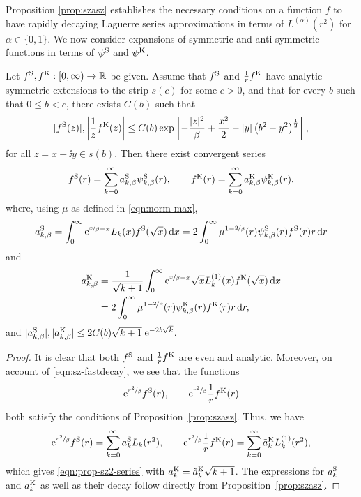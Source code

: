 Proposition \ref{prop:szasz} establishes the necessary conditions on a function $f$ to have rapidly decaying
Laguerre series approximations in terms of $L^{(\alpha)}(r^2)$ for $\alpha\in\{0,1\}$. We now consider
expansions of symmetric and anti-symmetric functions in terms of $\psi^{\mathrm{S}}$ and $\psi^{\mathrm{K}}$.

\begin{proposition} \label{prop:sz2}
Let $f^{\mathrm{S}}, f^{\mathrm{K}}: [0,\infty) \to \mathbb{R}$ be given. Assume that $f^{\mathrm{S}}$ and $\frac{1}{r}f^{\mathrm{K}}$ have analytic
symmetric extensions to the strip $s(c)$ for some $c>0$, and that for every $b$ such that $0\leq b<c$, there
exists $C(b)$ such that
\begin{equation} \label{eqn:sz-fastdecay}
    |f^{\mathrm{S}}(z)|, \left|\frac{1}{z}f^{\mathrm{K}}(z)\right| \leq C(b)
    \exp\left[-\frac{|z|^2}{\beta}+\frac{x^2}{2} - |y|\left(b^2 - y^2\right)^{\frac{1}{2}}\right],
\end{equation}
for all $z=x+\ii y \in s(b)$. Then there exist convergent series
\begin{equation} \label{eqn:prop-sz2-series}
    f^{\mathrm{S}}(r) = \sum_{k=0}^\infty a^{\mathrm{S}}_{k,\beta} \psi^{\mathrm{S}}_{k,\beta}(r), \qquad
    f^{\mathrm{K}}(r) = \sum_{k=0}^\infty a^{\mathrm{K}}_{k,\beta} \psi^{\mathrm{K}}_{k,\beta}(r),
\end{equation}
where, using $\mu$ as defined in \eqref{eqn:norm-max},
\begin{equation*}
    a^{\mathrm{S}}_{k,\beta} = \int_0^\infty \mathrm{e}^{\nicefrac{x}{\beta}-x} L_k(x) f^{\mathrm{S}}(\sqrt{x}) \,\mathrm{d} x
             = 2\int_0^\infty \mu^{1-\nicefrac{2}{\beta}}(r) \psi^{\mathrm{S}}_{k,\beta}(r) f^{\mathrm{S}}(r) r \,\mathrm{d} r \\
\end{equation*}
and
\begin{align*}
    a^{\mathrm{K}}_{k,\beta}
        &= \frac{1}{\sqrt{k+1}} \int_0^\infty \mathrm{e}^{\nicefrac{x}{\beta}-x}
                        \sqrt{x} L^{(1)}_k(x) f^{\mathrm{K}}(\sqrt{x}) \,\mathrm{d} x \\
        &= 2\int_0^\infty \mu^{1-\nicefrac{2}{\beta}}(r) \psi^{\mathrm{K}}_{k,\beta}(r) f^{\mathrm{K}}(r) r \,\mathrm{d} r,
\end{align*}
and $|a^{\mathrm{S}}_{k,\beta}|, |a^{\mathrm{K}}_{k,\beta}| \leq 2C(b)\sqrt{k+1}\;\mathrm{e}^{-2b\sqrt{k}}$.
\end{proposition}
\begin{proof}
It is clear that both $f^{\mathrm{S}}$ and $\frac{1}{r}f^{\mathrm{K}}$ are even and analytic. Moreover, on account of
\eqref{eqn:sz-fastdecay}, we see that the functions
\[
    \mathrm{e}^{\nicefrac{r^2}{\beta}}f^{\mathrm{S}}(r),\qquad \mathrm{e}^{\nicefrac{r^2}{\beta}}\frac{1}{r}f^{\mathrm{K}}(r)
\]
both satisfy the conditions of Proposition~\ref{prop:szasz}. Thus, we have
\[
    \mathrm{e}^{\nicefrac{r^2}{\beta}} f^{\mathrm{S}}(r) = \sum_{k=0}^\infty a^{\mathrm{S}}_k L_k(r^2), \qquad
    \mathrm{e}^{\nicefrac{r^2}{\beta}} \frac{1}{r} f^{\mathrm{K}}(r) = \sum_{k=0}^\infty \tilde{a}^{\mathrm{K}}_k L^{(1)}_k(r^2),
\]
which gives \eqref{eqn:prop-sz2-series} with $a^{\mathrm{K}}_k = \tilde{a}^{\mathrm{K}}_k\sqrt{k+1}$. The expressions for
$a^{\mathrm{S}}_k$ and $a^{\mathrm{K}}_k$ as well as their decay follow directly from Proposition~\ref{prop:szasz}.
\end{proof}
